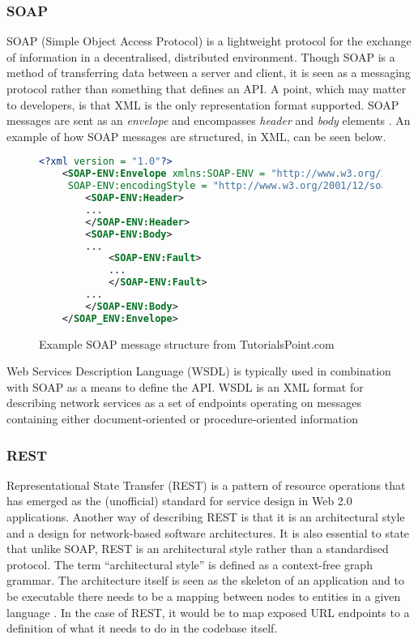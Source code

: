 \subsubsection{SOAP}

SOAP (Simple Object Access Protocol) is a lightweight protocol for the exchange of information in a decentralised, distributed environment.
Though SOAP is a method of transferring data between a server and client, it is seen as a messaging protocol rather than something that defines
an API.
A point, which may matter to developers, is that XML is the only representation format supported. 
SOAP messages are sent as an \textit{envelope} and encompasses \textit{header} and \textit{body} elements \cite{gruschka2006protecting}\cite{box2000simple}. 
An example of how SOAP messages are structured, in XML, can be seen below. 

\begin{figure}[ht]
    \begin{lstlisting}[language=XML, numbers=none]
<?xml version = "1.0"?>
    <SOAP-ENV:Envelope xmlns:SOAP-ENV = "http://www.w3.org/2001/12/soap-envelope" 
     SOAP-ENV:encodingStyle = "http://www.w3.org/2001/12/soap-encoding">
        <SOAP-ENV:Header>
        ...
        </SOAP-ENV:Header>
        <SOAP-ENV:Body>      
        ...
            <SOAP-ENV:Fault>
            ...
            </SOAP-ENV:Fault>
        ...
        </SOAP-ENV:Body>
    </SOAP_ENV:Envelope>
    \end{lstlisting}
    \caption{Example SOAP message structure from TutorialsPoint.com}
\end{figure}

Web Services Description Language (WSDL) is typically used in combination with SOAP as a means to define the API. 
WSDL is an XML format for describing network services as a set of endpoints operating on messages containing either document-oriented or procedure-oriented
information \cite{christensen2001web}


\subsubsection{REST} \label{restliterature}
Representational State Transfer (REST) is a pattern of resource operations that has emerged as the (unofficial) standard for service design in Web 2.0 applications. Another way of describing REST is that it is an architectural style and a design for network-based
software architectures.
It is also essential to state that unlike SOAP, REST is an architectural style rather than a standardised protocol.
The term ``architectural style'' is defined as a context-free graph grammar.
The architecture itself is seen as the skeleton of an application and to be executable there needs to be a mapping between nodes
to entities in a given language \cite{le1998describing} .
In the case of REST, it would be to map exposed URL endpoints to a definition of what it needs to do in the codebase itself.

